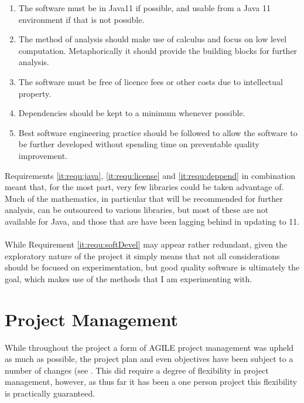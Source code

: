 \documentclass[main.tex]{subfiles}
\begin{document}
    \begin{enumerate}
      \item \label{it:requ:java} The software must be in Java11 if possible, and usable from a Java 11 environment if that is not possible.
      \item \label{it:requ:calculus} The method of analysis should make use of calculus and focus on low level computation. Metaphorically it should provide the building blocks for further analysis.
      \item \label{it:requ:license} The software must be free of licence fees or other costs due to intellectual property.
      \item \label{it:requ:deppend} Dependencies should be kept to a minimum whenever possible.
      \item \label{it:requ:softDevel} Best software engineering practice should be followed to allow the software to be further developed without spending time on preventable quality improvement.        
    \end{enumerate}
    
    Requirements \ref{it:requ:java}, \ref{it:requ:license} and \ref{it:requ:deppend} in combination meant that, for the most part, very few  libraries could be taken advantage of. Much of the mathematics, in particular that will be recommended for further analysis, can be outsourced to various libraries, but most of these are not available for Java, and those that are have been lagging behind in updating to 11. 
    \\\\
    While Requirement \ref{it:requ:softDevel} may appear rather redundant, given the exploratory nature of the project it simply means that not all considerations should be focused on experimentation, but good quality software is ultimately the goal, which makes use of the methods that I am experimenting with.
    
  \section{Project Management}
  
    While throughout the project a form of AGILE project management was upheld as much as possible, the project plan and even objectives have been subject to a number of changes (see . This did require a degree of flexibility in project management, however, as thus far it has been a one person project this flexibility is practically guaranteed.
    
\end{document}
